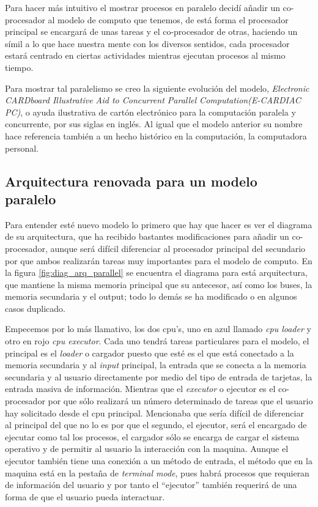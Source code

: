 \documentclass[letterpaper,12pt,oneside]{book}
\begin{document}
	 Para hacer más intuitivo el mostrar procesos en paralelo decidí añadir un co-procesador al modelo de computo que tenemos, de está forma el procesador principal
	 se encargará de unas tareas y el co-procesador de otras, haciendo un símil a lo que hace nuestra mente con los diversos sentidos, cada procesador
	 estará centrado en ciertas actividades mientras ejecutan
	 procesos al mismo tiempo.
	 
	 Para mostrar tal paralelismo se creo la siguiente evolución del modelo, \textit{Electronic CARDboard Illustrative Aid to
	 Concurrent Parallel Computation(E-CARDIAC PC)}, o ayuda ilustrativa de cartón electrónico para la computación paralela y concurrente, por
	 sus siglas en inglés. Al igual que el modelo anterior su nombre hace referencia también a un hecho histórico en la computación, la computadora
	 personal.
	 
	 	\subsection{Arquitectura renovada para un modelo paralelo}
	 	
	 	Para entender esté nuevo modelo lo primero que hay que hacer es ver el diagrama de su arquitectura, que ha recibido bastantes modificaciones para añadir
	 	un co-procesador, aunque será difícil diferenciar al procesador principal del secundario por que ambos realizarán tareas muy importantes
	 	para el modelo de computo. En la figura \ref{fig:diag_arq_parallel} se encuentra el diagrama para está arquitectura, que mantiene la misma memoria principal
	 	que su antecesor, así como los buses, la memoria secundaria y el output; todo lo demás se ha modificado o en algunos casos duplicado. 
	 	
	 	Empecemos por lo más llamativo, los dos cpu's, uno en azul llamado \textit{cpu loader} y otro en rojo \textit{cpu executor}. Cada uno tendrá tareas
	 	particulares para el modelo, el principal es el \textit{loader} o cargador puesto que esté es el que está conectado a la memoria secundaria y al
	 	\textit{input} principal, la entrada que se conecta a la memoria secundaria y al usuario directamente por medio del tipo de entrada de tarjetas,
	 	la entrada masiva de información. Mientras que el \textit{executor} o ejecutor es el co-procesador por que sólo realizará un número
	 	determinado de tareas que el usuario hay solicitado desde el cpu principal. Mencionaba que sería difícil de diferenciar al principal del que no lo es por que el
		segundo, el ejecutor, será el encargado de ejecutar como tal los procesos, el cargador sólo se encarga de cargar el sistema operativo y de permitir al usuario
		la interacción con la maquina. Aunque el ejecutor también tiene una conexión a un método de entrada, el método que en la maquina está en
		la pestaña de \textit{terminal mode}, pues habrá procesos que requieran de información del usuario y por tanto el ``ejecutor'' también requerirá
		de una forma de que el usuario pueda interactuar.
		
\end{document}
